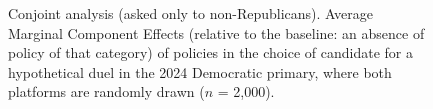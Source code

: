 \begin{figure}

  \caption{Conjoint analysis (asked only to non-Republicans). Average Marginal Component Effects (relative to the baseline: an absence of policy of that category) of policies in the choice of candidate for a hypothetical duel in the 2024 Democratic primary, where both platforms are randomly drawn ($n$ = 2,000).}\label{fig:ca_r}
\end{figure}

